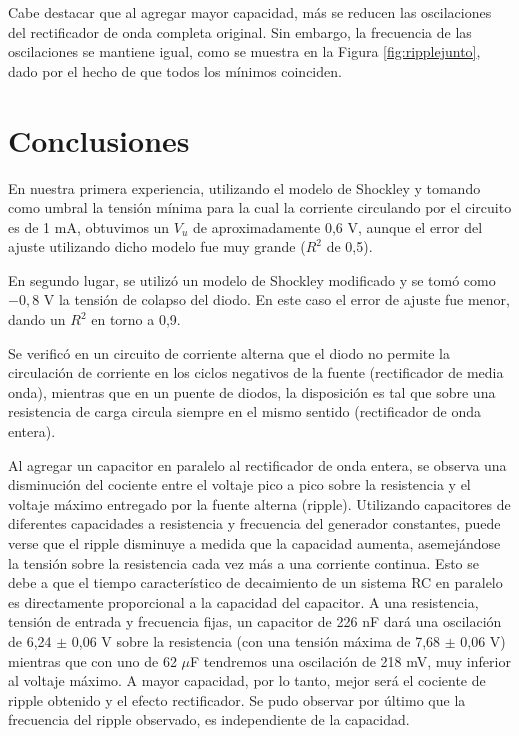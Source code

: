 \documentclass[twoside,twocolumn,a4paper]{article}
\begin{document}
Cabe destacar que al agregar mayor capacidad, m\'as se reducen las oscilaciones del rectificador de onda completa original. Sin embargo, la frecuencia de las oscilaciones se mantiene igual, como se muestra en la Figura \ref{fig:ripplejunto}, dado por el hecho de que todos los m\'inimos coinciden. 



\section{Conclusiones}
En nuestra primera experiencia, utilizando el modelo de Shockley y tomando como umbral la tensi\'on m\'inima para la cual la corriente circulando por el circuito es de 1 mA, obtuvimos un $V_{u}$ de aproximadamente 0,6 V, aunque el error del ajuste utilizando dicho modelo fue muy grande ($R^2$ de 0,5).

En segundo lugar, se utiliz\'o un modelo de Shockley modificado y se tom\'o como $-0,8$ V la tensi\'on de colapso del diodo. En este caso el error de ajuste fue menor, dando un $R^2$ en torno a 0,9.

Se verific\'o en un circuito de corriente alterna que el diodo no permite la circulaci\'on de corriente en los ciclos negativos de la fuente (rectificador de media onda), mientras que en un puente de diodos, la disposici\'on es tal que sobre una resistencia de carga circula siempre en el mismo sentido (rectificador de onda entera).

Al agregar un capacitor en paralelo al rectificador de onda entera, se observa una disminuci\'on del cociente entre el voltaje pico a pico sobre la resistencia y el voltaje m\'aximo entregado por la fuente alterna (ripple). Utilizando capacitores de diferentes capacidades a resistencia y frecuencia del generador constantes, puede verse que el ripple disminuye a medida que la capacidad aumenta, asemej\'andose la tensi\'on sobre la resistencia cada vez m\'as a una corriente continua. Esto se debe a que el tiempo caracter\'istico de decaimiento de un sistema RC en paralelo es directamente proporcional a la capacidad del capacitor. A una resistencia, tensi\'on de entrada y frecuencia fijas, un capacitor de 226 nF dar\'a una oscilaci\'on de 6,24 $\pm$ 0,06 V sobre la resistencia (con una tensi\'on m\'axima de 7,68 $\pm$ 0,06 V) mientras que con uno de 62 $\mu$F tendremos una oscilaci\'on de 218 mV, muy inferior al voltaje m\'aximo. A mayor capacidad, por lo tanto, mejor ser\'a el cociente de ripple obtenido y el efecto rectificador. Se pudo observar por \'ultimo que la frecuencia del ripple observado, es independiente de la capacidad. 
\end{document}
